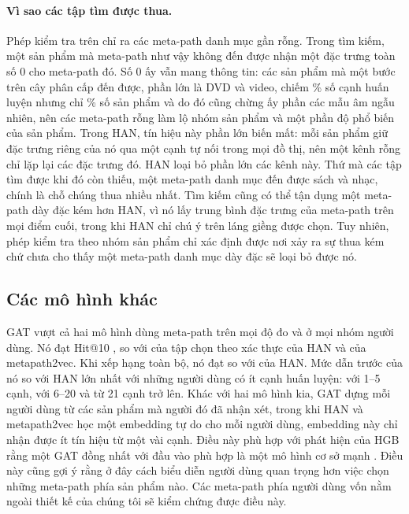 \paragraph{Vì sao các tập tìm được thua.} Phép kiểm tra trên chỉ ra các meta-path danh mục gần
rỗng. Trong tìm kiếm, một sản phẩm mà meta-path như vậy không đến được nhận một đặc trưng toàn số 0
cho meta-path đó. Số 0 ấy vẫn mang thông tin: các sản phẩm mà một bước trên cây phân cấp đến được,
phần lớn là DVD và video, chiếm \% số cạnh huấn luyện nhưng chỉ
\% số sản phẩm và do đó cũng chừng ấy phần các mẫu âm ngẫu nhiên,
nên các meta-path rỗng làm lộ nhóm sản phẩm và một phần độ phổ biến của sản phẩm. Trong HAN, tín
hiệu này phần lớn biến mất: mỗi sản phẩm giữ đặc trưng riêng của nó qua một cạnh tự nối trong mọi
đồ thị, nên một kênh rỗng chỉ lặp lại các đặc trưng đó. HAN loại bỏ phần lớn các kênh này. Thứ mà
các tập tìm được khi đó còn thiếu, một meta-path danh mục đến được sách và nhạc, chính là chỗ chúng
thua nhiều nhất. Tìm kiếm cũng có thể tận dụng một meta-path dày đặc kém hơn HAN, vì nó lấy trung
bình đặc trưng của meta-path trên mọi điểm cuối, trong khi HAN chỉ chú ý trên  láng
giềng được chọn. Tuy nhiên, phép kiểm tra theo nhóm sản phẩm chỉ xác định được nơi xảy ra sự thua
kém chứ chưa cho thấy một meta-path danh mục dày đặc sẽ loại bỏ được nó.

\subsection{Các mô hình khác}
\label{sec:res-models}

GAT vượt cả hai mô hình dùng meta-path trên mọi độ đo và ở mọi nhóm người dùng. Nó đạt Hit@10
, so với
 của tập chọn theo xác thực của HAN và  của metapath2vec.
Khi xếp hạng toàn bộ, nó đạt  so với  của HAN. Mức dẫn trước
của nó so với HAN lớn nhất với những người dùng có ít cạnh huấn luyện:  với 1--5
cạnh,  với 6--20 và  từ 21 cạnh trở lên. Khác với hai
mô hình kia, GAT dựng mỗi người dùng từ các sản phẩm mà người đó đã nhận xét, trong khi HAN và
metapath2vec học một embedding tự do cho mỗi người dùng, embedding này chỉ nhận được ít tín hiệu từ
một vài cạnh. Điều này phù hợp với phát hiện của HGB rằng một GAT đồng nhất với đầu vào phù hợp là
một mô hình cơ sở mạnh \citep{lv2021hgb}. Điều này cũng gợi ý rằng ở đây cách biểu diễn người dùng
quan trọng hơn việc chọn những meta-path phía sản phẩm nào. Các meta-path phía người dùng vốn nằm
ngoài thiết kế của chúng tôi sẽ kiểm chứng được điều này.

